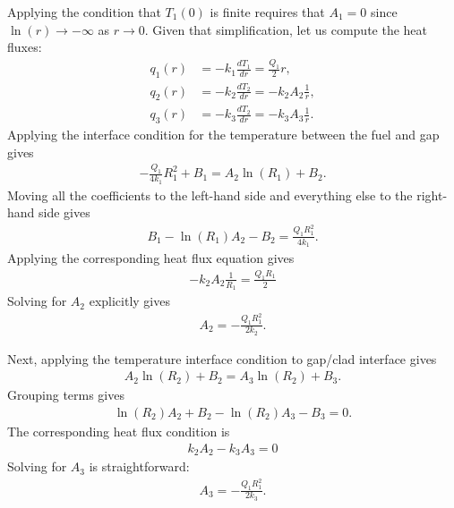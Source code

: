 Applying the condition that $T_1(0)$ is finite requires that $A_1 = 0$ since $\ln( r ) \rightarrow -\infty$ as $r \rightarrow 0$. Given that simplification, let us compute the heat fluxes:
\begin{subequations}
\begin{align}
  q_1(r) &= -k_1 \frac{dT_1}{dr} = \frac{Q_1}{2} r, \\
  q_2(r) &= -k_2 \frac{dT_2}{dr} = -k_2 A_2 \frac{1}{r}, \\
  q_3(r) &= -k_3 \frac{dT_2}{dr} = -k_3 A_3 \frac{1}{r}.
\end{align}
\end{subequations}
Applying the interface condition for the temperature between the fuel and gap gives
\begin{align}
  -\frac{Q_1}{4k_1} R_1^2 + B_1 = A_2 \ln( R_1 ) + B_2.
\end{align}
Moving all the coefficients to the left-hand side and everything else to the right-hand side gives
\begin{align}
  B_1 - \ln( R_1 ) A_2 - B_2 = \frac{Q_1 R_1^2}{4k_1} .
\end{align}
Applying the corresponding heat flux equation gives
\begin{align}
  -k_2 A_2 \frac{1}{R_1} = \frac{Q_1 R_1}{2} 
\end{align}
Solving for $A_2$ explicitly gives
\begin{align}
  A_2 = -\frac{Q_1 R_1^2}{2 k_2}  .
\end{align}

Next, applying the temperature interface condition to gap/clad interface gives
\begin{align}
   A_2 \ln( R_2 ) + B_2 = A_3 \ln( R_2 ) + B_3.
\end{align}
Grouping terms gives
\begin{align}
   \ln( R_2 ) A_2  + B_2 - \ln( R_2 ) A_3  - B_3 = 0.
\end{align}
The corresponding heat flux condition is
\begin{align}
   k_2 A_2  - k_3 A_3 = 0
\end{align}
Solving for $A_3$ is straightforward:
\begin{align}
  A_3 = -\frac{Q_1 R_1^2}{2 k_3}.
\end{align}

